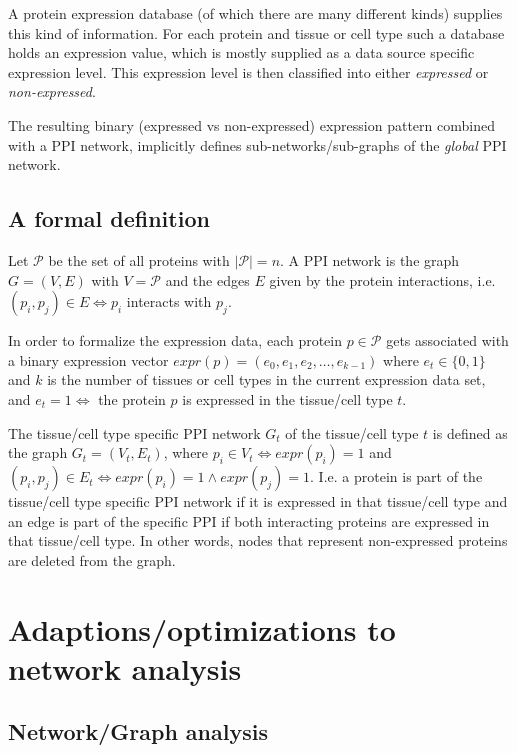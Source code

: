 \documentclass{article}
\begin{document}
A protein expression database (of which there are many different kinds)
supplies this kind of information. For each protein and tissue or cell type
such a database holds an expression value, which is mostly supplied as
a data source specific expression level. This expression level is then
classified into either \emph{expressed} or \emph{non-expressed}.

The resulting binary (expressed vs non-expressed) expression pattern
combined with a PPI network, implicitly defines sub-networks/sub-graphs
of the \emph{global} PPI network.


\subsection{A formal definition}

Let $\mathcal{P}$ be the set of all proteins with
$\left| \mathcal{P} \right| = n$. A PPI network is the graph $G=(V,E)$ with
$V = \mathcal{P}$ and the edges $E$ given by the protein interactions,
i.e. $(p_i, p_j) \in E \Leftrightarrow p_i$ interacts with $p_j$.

In order to formalize the expression data, each protein $p \in \mathcal{P}$
gets associated with a binary expression vector
$expr(p) = (e_0, e_1, e_2, \ldots, e_{k-1})$ where $e_t \in \{0,1\}$
and $k$ is the number of tissues or cell types in the current expression data
set, and $e_t = 1 \Leftrightarrow $ the protein $p$ is expressed in the
tissue/cell type $t$.

The tissue/cell type specific PPI network $G_t$ of the tissue/cell type $t$ is
defined as the graph $G_t = (V_t, E_t)$, where
$p_i \in V_t \Leftrightarrow expr(p_i) = 1$
and
$(p_i, p_j) \in E_t \Leftrightarrow expr(p_i) = 1 \wedge expr(p_j) = 1$.
I.e. a protein is part of the tissue/cell type specific PPI network if it is
expressed in that tissue/cell type and an edge is part of the specific PPI
if both interacting proteins are expressed in that tissue/cell type.
In other words, nodes that represent non-expressed proteins are deleted
from the graph.


\section{Adaptions/optimizations to network analysis}

\subsection{Network/Graph analysis}
\end{document}
